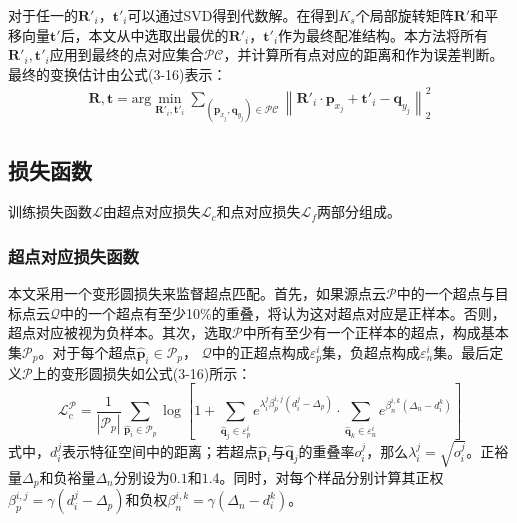     对于任一的$\mathbf{R'}_i$，$\mathbf{t'}_i$可以通过SVD得到代数解。在得到$K_s$个局部旋转矩阵$\mathbf{R'}$和平移向量$\mathbf{t'}$后，本文从中选取出最优的$\mathbf{R'}_i$，$\mathbf{t'}_i$作为最终配准结构。本方法将所有$\mathbf{R'}_i, \mathbf{t'}_i$应用到最终的点对应集合$\mathcal{PC}$，并计算所有点对应的距离和作为误差判断。最终的变换估计由公式(3-16)表示：
    \begin{equation}
        \begin{aligned}
        \mathbf{R}, \mathbf{t}=
        \mathrm{arg}\min_{\mathbf{R'}_i,\mathbf{t'}_i} 
        \sum_{(\mathbf{p}_{x_j},\mathbf{q}_{y_j}) \in \mathcal{PC}}
        \left\|
            \mathbf{R'}_i\cdot\mathbf{p}_{x_j}+\mathbf{t'}_i-\mathbf{q}_{y_j}
        \right\|_{2}^{2}
        \end{aligned}
    \end{equation}

    \subsection{损失函数}
    训练损失函数$\mathcal{L}$由超点对应损失$\mathcal{L}_c$和点对应损失$\mathcal{L}_f$两部分组成。\par
    \subsubsection{超点对应损失函数}
    本文采用一个变形圆损失来监督超点匹配。首先，如果源点云$\mathcal{P}$中的一个超点与目标点云$\mathcal{Q}$中的一个超点有至少10\%的重叠，将认为这对超点对应是正样本。否则，超点对应被视为负样本。其次，选取$\mathcal{P}$中所有至少有一个正样本的超点，构成基本集$\mathcal{P}_p$。对于每个超点$\hat{\mathbf{p}}_i \in  \mathcal{P}_p$， $\mathcal{Q}$中的正超点构成$\varepsilon_p^i$集，负超点构成$\varepsilon_n^i$集。最后定义$\mathcal{P}$上的变形圆损失如公式(3-16)所示：
    \begin{equation}
        \mathcal{L}_{c}^{\mathcal{P}}=
        \frac{1}{|\mathcal{P}_p|}
        \sum_{\hat{\mathbf{p}}_i \in \mathcal{P}_p} 
        \log[1+\sum_{\hat{\mathbf{q}}_j \in \varepsilon_{p}^{i}}e^{\lambda_{i}^{j} \beta_{p}^{i, j}\left(d_{i}^{j}-\Delta_{p}\right)}
        \cdot \sum_{\hat{\mathbf{q}}_k \in \varepsilon_{n}^{i}}e^{\beta_{n}^{i, k}\left(\Delta_{n}-d_{i}^{k}\right)}]
    \end{equation}
    式中，$d_i^j$表示特征空间中的距离；若超点$\hat{\mathbf{p}}_i$与$\hat{\mathbf{q}}_j$的重叠率$o_i^j$，那么$\lambda_{i}^{j}=\sqrt{o_i^j}$。正裕量$\Delta_{p}$和负裕量$\Delta_{n}$分别设为$0.1$和$1.4$。同时，对每个样品分别计算其正权$\beta_{p}^{i, j}= \gamma \left(d_{i}^{j}-\Delta_{p}\right)$和负权$\beta_{n}^{i, k} = \gamma \left(\Delta_{n}-d_{i}^{k}\right)$。

